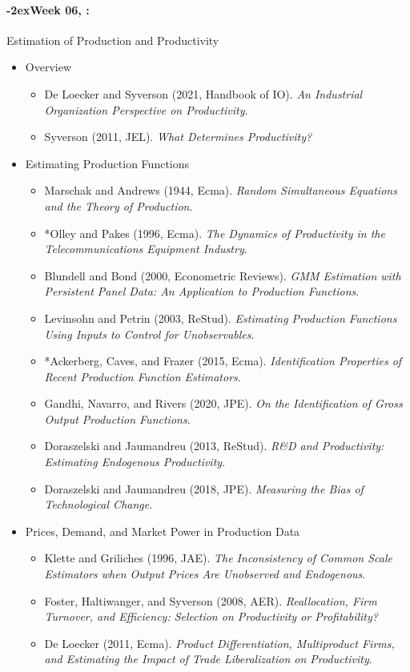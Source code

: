 \documentclass[11pt]{article}
\newcommand{\week}[1]{%
  \sbox{\weekdatebox}{\syldate{\today}}%
  \paragraph*{\kern-2ex\quad #1, \usebox{\weekdatebox}:}%
  \AdvanceDate[7]%
}
\begin{document}
\week{Week 06} Estimation of Production and Productivity
\begin{itemize}
\item Overview
\begin{itemize}
\item De Loecker and Syverson (2021, Handbook of IO). \textit{An Industrial Organization Perspective on Productivity}.
\item Syverson (2011, JEL). \textit{What Determines Productivity?}
\end{itemize}
\item Estimating Production Functions
\begin{itemize}
\item Marschak and Andrews (1944, Ecma). \textit{Random Simultaneous Equations and the Theory of Production}.
\item *Olley and Pakes (1996, Ecma). \textit{The Dynamics of Productivity in the Telecommunications Equipment Industry}.
\item Blundell and Bond (2000, Econometric Reviews). \textit{GMM Estimation with Persistent Panel Data: An Application to Production Functions}.
\item Levinsohn and Petrin (2003, ReStud). \textit{Estimating Production Functions Using Inputs to Control for Unobservables}.
\item *Ackerberg, Caves, and Frazer (2015, Ecma). \textit{Identification Properties of Recent Production Function Estimators}.
\item Gandhi, Navarro, and Rivers (2020, JPE). \textit{On the Identification of Gross Output Production Functions}.
\item Doraszelski and Jaumandreu (2013, ReStud). \textit{R\&D and Productivity: Estimating Endogenous Productivity}.
\item Doraszelski and Jaumandreu (2018, JPE). \textit{Measuring the Bias of Technological Change}.
\end{itemize}
\item Prices, Demand, and Market Power in Production Data
\begin{itemize}
\item Klette and Griliches (1996, JAE). \textit{The Inconsistency of Common Scale Estimators when Output Prices Are Unobserved and Endogenous}.
\item Foster, Haltiwanger, and Syverson (2008, AER). \textit{Reallocation, Firm Turnover, and Efficiency: Selection on Productivity or Profitability?}
\item De Loecker (2011, Ecma). \textit{Product Differentiation, Multiproduct Firms, and Estimating the Impact of Trade Liberalization on Productivity}.

\end{itemize}
\end{itemize}
\end{document}
